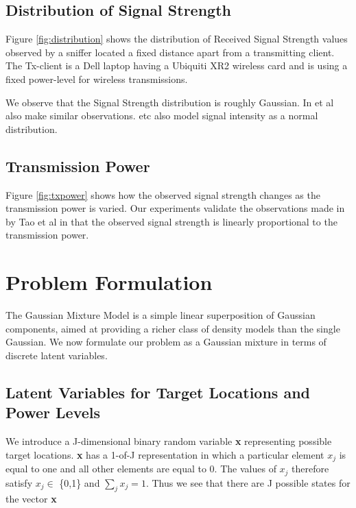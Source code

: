 \documentclass{Localization-PaperWriteupDraft}
\begin{document}
\subsection{Distribution of Signal Strength}
\label{subsec:distributionofsignalstrength}

Figure \ref{fig:distribution} shows the distribution of Received Signal
Strength values observed by a sniffer located a fixed distance apart
from a transmitting client. The Tx-client is a Dell laptop having a
Ubiquiti XR2 wireless card and is using a fixed power-level for wireless
transmissions. 

We observe that the Signal Strength distribution is roughly Gaussian. In
\cite{Tao:2003:WLL:941311.941314} et al also make similar observations.
\cite{Haeberlen:2004:PRL:1023720.1023728} \cite{Moraes:2006:CWL:1164783.1164799} etc also model signal intensity
as a normal distribution.

\subsection{Transmission Power}
\label{subsec:transmissionpower}

Figure \ref{fig:txpower} shows how the observed signal strength changes
as the transmission power is varied. Our experiments validate the
observations made in \cite{Tao:2003:WLL:941311.941314} by Tao et al in that the observed
signal strength is linearly proportional to the transmission power.

\section{Problem Formulation}
\label{sec:problemformulation}

The Gaussian Mixture Model is a simple linear superposition of Gaussian components, aimed at providing a richer class of density models than the single Gaussian. We now formulate our problem as a Gaussian mixture in terms of discrete latent variables. 

\subsection{Latent Variables for Target Locations and Power Levels}
\label{subsec:latentvariablesfortargetlocationsandpowerlevels}

We introduce a J-dimensional binary random variable {\bf x} representing possible target locations. {\bf x} has a 1-of-J representation in which a particular element $x_{j}$ is equal to one and all other elements are equal to 0. The values of $x_{j}$ therefore satisfy $x_{j} \in$ \{0,1\} and $\sum_{j} x_{j} = 1$. Thus we see that there are J possible states for the vector {\bf x} \\
\end{document}
